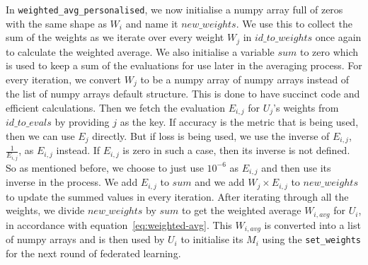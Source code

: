 \documentclass[12pt]{article}
\begin{document}
In \texttt{weighted\_avg\_personalised}, we now initialise a numpy array full of zeros with the same shape as $W_i$ and name it $new\_weights$. We use this to collect the sum of the weights as we iterate over every weight $W_j$ in $id\_to\_weights$ once again to calculate the weighted average. We also initialise a variable $sum$ to zero which is used to keep a sum of the evaluations for use later in the averaging process. For every iteration, we convert $W_j$ to be a numpy array of numpy arrays instead of the list of numpy arrays default structure. This is done to have succinct code and efficient calculations. Then we fetch the evaluation $E_{i,j}$ for $U_j$'s weights from $id\_to\_evals$ by providing $j$ as the key. If accuracy is the metric that is being used, then we can use $E_j$ directly. But if loss is being used, we use the inverse of $E_{i,j}$, $\frac{1}{E_{i,j}}$, as $E_{i,j}$ instead. If $E_{i,j}$ is zero in such a case, then its inverse is not defined. So as mentioned before, we choose to just use $10^{-6}$ as $E_{i,j}$ and then use its inverse in the process. We add $E_{i,j}$ to $sum$ and we add $W_j \times E_{i,j}$ to $new\_weights$ to update the summed values in every iteration. After iterating through all the weights, we divide $new\_weights$ by $sum$ to get the weighted average $W_{i,avg}$ for $U_i$, in accordance with equation~\ref{eq:weighted-avg}. This $W_{i,avg}$ is converted into a list of numpy arrays and is then used by $U_i$ to initialise its $M_i$ using the \texttt{set\_weights} for the next round of federated learning. 
\end{document}
